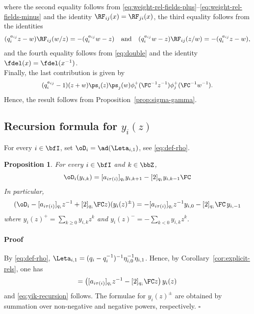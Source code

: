 \documentclass[reqno]{amsart}
\numberwithin{equation}{section}
\newtheorem*{proposition}{Proposition}
\newenvironment{pf}{\medskip\paragraph{{\sc Proof}}}{\hfill$\square$\par\medskip}
\begin{document}
where the second equality follows from \eqref{eq:weight-rel-fields-plus}--\eqref{eq:weight-rel-fields-minus} and the identity
$\RF_{ij}(x)=\RF_{ji}(x)$, the third equality follows from the identities
\begin{equation}
(q_i^{a_{ij}}z-w)\RF_{ij}(w/z)=-(q_i^{a_{ij}}w-z)\quad\mbox{and}\quad	(q_i^{a_{ij}}w-z)\RF_{ij}(z/w)=-(q_i^{a_{ij}}z-w),
\end{equation}
and the fourth equality follows from \eqref{eq:double} and the identity $\fdel(x)=\fdel(x^{-1})$.\\

Finally, the last contribution is given by
	\begin{equation}
	\small
	\begin{split}
		(q_i^{a_{ij}}-1)(z+w)\ps_i(z)\ps_j(w)\phi_i^+(\FC^{-1}z^{-1})\phi_j^+(\FC^{-1}w^{-1}).
	\end{split}
	\end{equation}
Hence, the result follows from Proposition~\ref{prop:sigma-gamma}.


\subsection{Recursion formula for $y_i(z)$}
For every $i\in\bfI$, set $\oD_i=\ad(\Leta_{i,1})$, see \eqref{eq:def-rho}. 

\begin{proposition}\label{prop:y-rationality}
For every $i\in\bfI$ and $k\in\bbZ$,
\begin{equation}\label{eq:yik-recursion}
	\oD_i(y_{i,k})
	=[a_{i\tau(i)}]_{q_i}y_{i,k+1}-[2]_{q_i}y_{i,k-1}\FC
\end{equation}
In particular,
	\begin{equation}\label{eq:yi-recursion}
	(\oD_i-[a_{i\tau(i)}]_{q_i} z^{-1}
	+[2]_{q_i}\FC z)(y_i(z)^\pm)
	=
	-
	[a_{i\tau(i)}]_{q_i} z^{-1}y_{i,0}
	-
	[2]_{q_i}\FC\, y_{i,-1}
\end{equation}
where $y_i(z)^+=\sum_{k\geqslant 0}y_{i,k}z^k$ and 
$y_i(z)^-=-\sum_{k<0}y_{i,k}z^k$.
\end{proposition}

\begin{pf}
By \eqref{eq:def-rho}, $\Leta_{i,1}=(q_i-q_i^{-1})^{-1}\eta_{i,0}^{-1}\eta_{i,1}$. Hence, by Corollary~\ref{cor:explicit-rels}, one has
\begin{equation}
	[\Leta_{i,1},y_i(z)]
	=
	\left(
	[a_{i\tau(i)}]_{q_i} z^{-1}
	-
	[2]_{q_i}\FC z
	\right)y_i(z)
\end{equation}
and \eqref{eq:yik-recursion} follows. 
The formulae for $y_i(z)^{\pm}$ are obtained by summation over non-negative and negative powers, respectively.
\end{pf}
\end{document}
